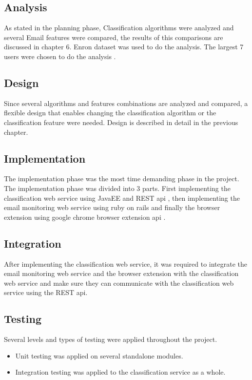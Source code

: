 \subsection{Analysis}
As stated in the planning phase, Classification algorithms were analyzed and 
several Email features were compared, the results of this comparisons are 
discussed in chapter 6. Enron dataset was used to do the analysis. The largest 7 
users were chosen to do the analysis \cite{RON04}.

\subsection{Design}
Since several algorithms and features combinations are analyzed and compared, 
a flexible design that enables changing the classification algorithm or the 
classification feature were needed. Design is described in detail in the previous 
chapter.

\subsection{Implementation}
The implementation phase was the most time demanding phase in the project. The 
implementation phase was divided into 3 parts. First implementing the 
classification web service using JavaEE and REST api \cite{REST},
then implementing the email monitoring web service using ruby on rails \cite{ROR}
and finally the browser extension using google chrome browser extension api \cite{CHROME}.

\subsection{Integration}
After implementing the classification web service,
it was required to integrate the email monitoring web service and the browser extension with
the classification web service and make sure they can communicate with the classification web
service using the REST api.

\subsection{Testing}
Several levels and types of testing were applied throughout the project.
\begin{itemize}
  \item Unit testing was applied on several standalone modules.
  \item Integration testing was applied to the classification service as a whole.
\end{itemize}

